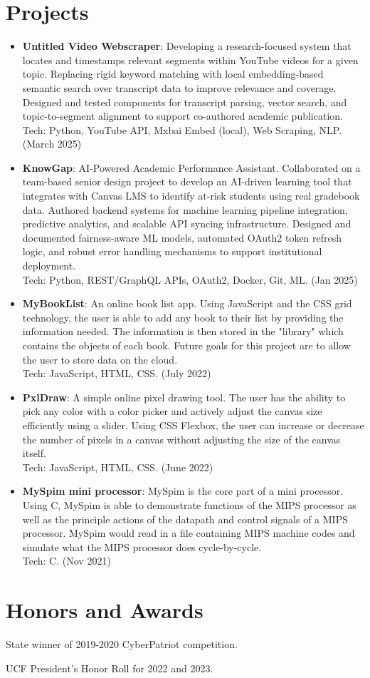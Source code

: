 \documentclass[a4paper,20pt]{article}
\newcommand{\resumeItem}[2]{
  \item\normalsize{
    \textbf{#1}{: #2 \vspace{1pt}}
  }
}
\newcommand{\resumeSubItem}[2]{\resumeItem{#1}{#2}\vspace{1pt}}
\newcommand{\resumeSubHeadingListStart}{\begin{itemize}[leftmargin=*]}
\newcommand{\resumeSubHeadingListEnd}{\end{itemize}}
\begin{document}
    
    \section{Projects}
        \resumeSubHeadingListStart
            \resumeSubItem{Untitled Video Webscraper}{Developing a research-focused system that locates and timestamps relevant segments within YouTube videos for a given topic. Replacing rigid keyword matching with local embedding-based semantic search over transcript data to improve relevance and coverage. Designed and tested components for transcript parsing, vector search, and topic-to-segment alignment to support co-authored academic publication.\\Tech: Python, YouTube API, Mxbai Embed (local), Web Scraping, NLP. (March 2025)}
            \resumeSubItem{KnowGap}{AI-Powered Academic Performance Assistant. Collaborated on a team-based senior design project to develop an AI-driven learning tool that integrates with Canvas LMS to identify at-risk students using real gradebook data. Authored backend systems for machine learning pipeline integration, predictive analytics, and scalable API syncing infrastructure. Designed and documented fairness-aware ML models, automated OAuth2 token refresh logic, and robust error handling mechanisms to support institutional deployment.\\Tech: Python, REST/GraphQL APIs, OAuth2, Docker, Git, ML. (Jan 2025)}
            \resumeSubItem{MyBookList}{An online book list app. Using JavaScript and the CSS grid technology, the user is able to add any book to their list by providing the information needed. The information is then stored in the "library" which contains the objects of each book. Future goals for this project are to allow the user to store data on the cloud.\\Tech: JavaScript, HTML, CSS. (July 2022)}
            \resumeSubItem{PxlDraw}{A simple online pixel drawing tool. The user has the ability to pick any color with a color picker and actively adjust the canvas size efficiently using a slider. Using CSS Flexbox, the user can increase or decrease the number of pixels in a canvas without adjusting the size of the canvas itself.\\Tech: JavaScript, HTML, CSS. (June 2022)}
            \resumeSubItem{MySpim mini processor}{MySpim is the core part of a mini processor. Using C, MySpim is able to demonstrate functions of the MIPS processor as well as the principle actions of the datapath and control signals of a MIPS processor. MySpim would read in a file containing MIPS machine codes and simulate what the MIPS processor does cycle-by-cycle.\\Tech: C. (Nov 2021)}
            \vspace{2pt}
        \resumeSubHeadingListEnd
    
    
    \section{Honors and Awards}
        \begin{description}[font=$\bullet$]
            \item {State winner of 2019-2020 CyberPatriot competition.}
            \item {UCF President's Honor Roll for 2022 and 2023.}
        \end{description}
        
\end{document}
